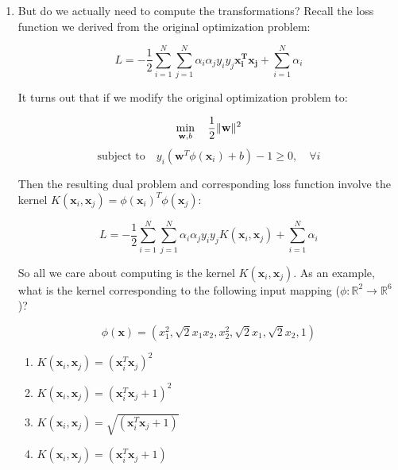 \documentclass{article}
\begin{document}
\begin{enumerate}

\textbf{Solution:} The correct answer is \(\textbf{a) } 2^d\).

A subset-product feature is formed by choosing any subset of the \(d\) input dimensions and multiplying the chosen coordinates together. For each dimension, we have two choices: include it or exclude it from the product. Therefore, the total number of possible subset-products is \(2^d\) (including the empty subset, which corresponds to the constant feature \(1\)). This exponential growth is one reason explicit feature expansion becomes infeasible in high dimensions, and motivates using kernels to compute these inner products implicitly.

\item But do we actually need to compute the transformations? Recall the loss function we derived from the original optimization problem:

\[
L = -\frac{1}{2}\sum_{i=1}^{N} \sum_{j=1}^{N} \alpha_i \alpha_j y_i y_j \mathbf{x^T_i} \mathbf{x_j} + \sum_{i=1}^{N} \alpha_i
\]

It turns out that if we modify the original optimization problem to:

\[
\min_{\mathbf{w}, b} \quad \frac{1}{2} \|\mathbf{w}\|^2 \\
\]
\[
\text{subject to} \quad y_i (\mathbf{w}^T \phi(\mathbf{x}_i) + b) - 1 \geq 0, \quad \forall i
\]

Then the resulting dual problem and corresponding loss function involve the kernel \( K(\mathbf{x}_i, \mathbf{x}_j) = \phi(\mathbf{x}_i)^T \phi(\mathbf{x}_j) \):

\[
L = -\frac{1}{2} \sum_{i=1}^{N} \sum_{j=1}^{N} \alpha_i \alpha_j y_i y_j K(\mathbf{x}_i, \mathbf{x}_j) + \sum_{i=1}^{N} \alpha_i
\]

So all we care about computing is the kernel \( K(\mathbf{x}_i,\mathbf{x}_j)\). As an example, what is the kernel corresponding to the following input mapping ($\phi:\mathbb{R}^2\rightarrow\mathbb{R}^6$)?

\[
\phi(\mathbf{x}) = (x_1^2, \sqrt{2}x_1x_2, x_2^2, \sqrt{2}x_1, \sqrt{2}x_2, 1)
\]

\begin{enumerate}
    \item \(K(\mathbf{x}_i,\mathbf{x}_j) = (\mathbf{x}_i^T \mathbf{x}_j)^2\)
    \item \(K(\mathbf{x}_i,\mathbf{x}_j) = (\mathbf{x}_i^T \mathbf{x}_j + 1)^2\)
    \item \(K(\mathbf{x}_i,\mathbf{x}_j) = \sqrt{(\mathbf{x}_i^T \mathbf{x}_j + 1)}\)
    \item \(K(\mathbf{x}_i,\mathbf{x}_j) = (\mathbf{x}_i^T \mathbf{x}_j + 1)\)
\end{enumerate}


\end{enumerate}
\end{document}
